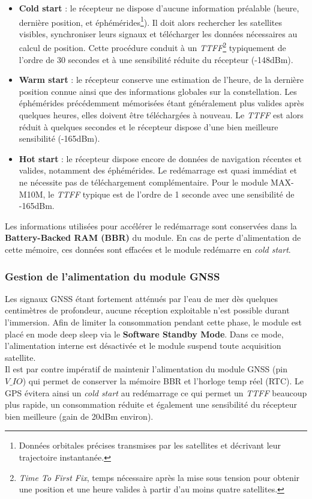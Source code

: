 \documentclass[12pt]{article}
\begin{document}
\begin{itemize}
    \item \textbf{Cold start} : le récepteur ne dispose d'aucune information préalable (heure, dernière position, et  éphémérides\footnote{Données orbitales précises transmises par les satellites et décrivant leur trajectoire instantanée.}). Il doit alors rechercher les satellites visibles, synchroniser leurs signaux et télécharger les données nécessaires au calcul de position. Cette procédure conduit à un \textit{TTFF}\footnote{\textit{Time To First Fix}, temps nécessaire après la mise sous tension pour obtenir une position et une heure valides à partir d'au moins quatre satellites.} typiquement de l'ordre de 30 secondes et à une sensibilité réduite du récepteur (-148dBm).

    \item \textbf{Warm start} : le récepteur conserve une estimation de l'heure, de la dernière position connue ainsi que des informations globales sur la constellation. Les éphémérides précédemment mémorisées étant généralement plus valides après quelques heures, elles doivent être téléchargées à nouveau. Le \textit{TTFF} est alors réduit à quelques secondes et le récepteur dispose d'une bien meilleure sensibilité (-165dBm).

    \item \textbf{Hot start} : le récepteur dispose encore de données de navigation récentes et valides, notamment des éphémérides. Le redémarrage est quasi immédiat et ne nécessite pas de téléchargement complémentaire. Pour le module MAX-M10M, le \textit{TTFF} typique est de l'ordre de 1 seconde avec une sensibilité de -165dBm.
\end{itemize}

Les informations utilisées pour accélérer le redémarrage sont conservées dans la \textbf{Battery-Backed RAM (BBR)} du module. En cas de perte d'alimentation de cette mémoire, ces données sont effacées et le module redémarre en \textit{cold start}.

\subsubsection{Gestion de l'alimentation du module GNSS}

Les signaux GNSS étant fortement atténués par l'eau de mer dès quelques centimètres de profondeur, aucune réception exploitable n'est possible durant l'immersion. Afin de limiter la consommation pendant cette phase, le module est placé en mode deep sleep via le \textbf{Software Standby Mode}. Dans ce mode, l'alimentation interne est désactivée et le module suspend toute acquisition satellite. \\
Il est par contre impératif de maintenir l'alimentation du module GNSS (pin $V\_IO$) qui permet de conserver la mémoire BBR et l'horloge temp réel (RTC). Le GPS évitera ainsi un \textit{cold start} au redémarrage ce qui permet un \textit{TTFF} beaucoup plus rapide, un consommation réduite et également une sensibilité du récepteur bien meilleure (gain de 20dBm environ).\\
\end{document}
